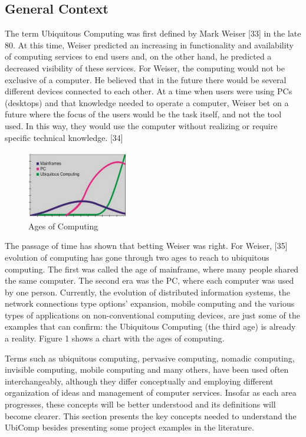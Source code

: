 \documentclass{acm_proc_article-sp}
\begin{document}
\subsection{General Context}
The term Ubiquitous Computing was first defined by Mark Weiser [33] in the late 80. At this time, Weiser predicted an increasing in functionality and availability of computing services to end users and, on the other hand, he predicted a decreased visibility of these services. For Weiser, the computing would not be exclusive of a computer. He believed that in the future there would be several different devices connected to each other. At a time when users were using PCs (desktops) and that knowledge needed to operate a computer,  Weiser bet on a future where the focus of the users would be the task itself, and not the tool used. In this way, they would use the computer without realizing or require specific technical knowledge. [34]
\begin{figure}[h]
    \includegraphics[width=0.4\textwidth,natwidth=610,natheight=642]{pictures/era.png}
    \caption{Ages of Computing}
\end{figure}
\newline
\newline
The passage of time has shown that betting Weiser was right. For Weiser, [35] evolution of computing has gone through two ages to reach to ubiquitous computing. The first was called the age of mainframe, where many people shared the same computer. The second era was the PC, where each computer was used by one person. Currently, the evolution of distributed information systems, the network connections type options'  expansion, mobile computing and the various types of applications on non-conventional computing devices, are just some of the examples that can confirm: the Ubiquitous Computing (the third age) is already a reality. Figure 1 shows a chart with the ages of computing.
\newline
\newline


Terms such as ubiquitous computing, pervasive computing, nomadic computing, invisible computing, mobile computing and many others, have been used often interchangeably, although they differ conceptually and employing different organization of ideas and management of computer services. Insofar as each area progresses, these concepts will be better understood and its definitions will become clearer. This section presents the key concepts needed to understand the UbiComp besides presenting some project examples in the literature.
\end{document}
